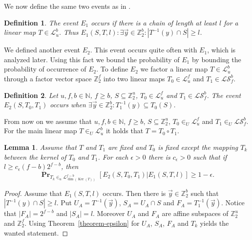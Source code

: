 \documentclass{article}
\newcommand{\vecspace}[2]{\mathbb{Z}_{#1}^{#2}}
\newcommand{\binvecspace}[1]{\vecspace{2}{#1}}
\newcommand{\linearmaps}[2]{\mathcal{L}_{#1}^{#2}}
\newcommand{\surjectivelinearmaps}[2]{\mathcal{LS}_{#1}^{#2}}
\newcommand{\probs}[2]{\operatorname{\mathbf{Pr}}_{{#1}}\left[{#2}\right]}
\newtheorem{lemma}{Lemma}
\newtheorem{definition}{Definition}
\begin{document}
We now define the same two events as in \cite{alonetal}.
\begin{definition}
The event $E_1$ occurs if there is a chain of length at least $l$ for a linear map $T \in \linearmaps{u}{b}$. Thus $E_1(S, T, l): \exists \vec{y} \in \binvecspace{b} \colon |T^{-1}(y) \cap S| \geq l$.
\end{definition}

We defined another event $E_2$. This event occurs quite often with $E_1$, which is analyzed later. Using this fact we bound the probability of $E_1$ by bounding the probability of occurrence of $E_2$. To define $E_2$ we factor a linear map $T \in \linearmaps{u}{b}$ through a factor vector space $\binvecspace{f}$ into two linear maps $T_0 \in \linearmaps{u}{f}$ and $T_1 \in \surjectivelinearmaps{f}{b}$.
\begin{definition}
Let $u, f, b \in \mathbb{N}$, $f \geq b$, $S \subseteq \binvecspace{u}$, $T_0 \in \linearmaps{u}{f}$ and $T_1 \in \surjectivelinearmaps{f}{b}$.
The event $E_2(S, T_0, T_1)$ occurs when $\exists \vec{y} \in \binvecspace{b} \colon T_1^{-1}(y) \subseteq T_0(S)$.
\end{definition}

From now on we assume that $u, f, b \in \mathbb{N}$, $f \geq b$, $S \subseteq \binvecspace{u}$, $T_0 \in_U \linearmaps{u}{f}$ and $T_1 \in_U \surjectivelinearmaps{f}{b}$. 
For the main linear map $T \in_U \linearmaps{u}{b}$ it holds that $T = T_0 \circ T_1$.

\begin{lemma}
\label{lemma-e1-e2}
Assume that $T$ and $T_1$ are fixed and $T_0$ is fixed except the mapping $T_k$ between the kernel of $T_0$ and $T_1$.
For each $\epsilon > 0$ there is $c_\epsilon > 0$ such that if $l \geq c_\epsilon (f - b)2^{f-b}$, then
\[
\probs{T_k \in_u \linearmaps{\operatorname{dim}(\operatorname{Ker}(T))}{f-b}}{E_2(S, T_0, T_1) | E_1(S, T, l)} \geq 1 - \epsilon.
\]
\end{lemma}
\begin{proof}
Assume that $E_1(S, T, l)$ occurs. 
Then there is $\vec{y} \in \binvecspace{b}$ such that $|T^{-1}(y) \cap S| \geq l$.
Put $U_A = T^{-1}(\vec{y})$, $S_A = U_A \cap S$ and $F_A = T_1^{-1}(\vec{y})$.
Notice that $|F_A| = 2^{f-b}$ and $|S_A| = l$.
Moreover $U_A$ and $F_A$ are affine subspaces of $\binvecspace{u}$ and $\binvecspace{f}$.
Using Theorem~\ref{theorem-epsilon} for $U_A$, $S_A$, $F_A$ and $T_k$ yields the wanted statement.
\end{proof}
\end{document}
